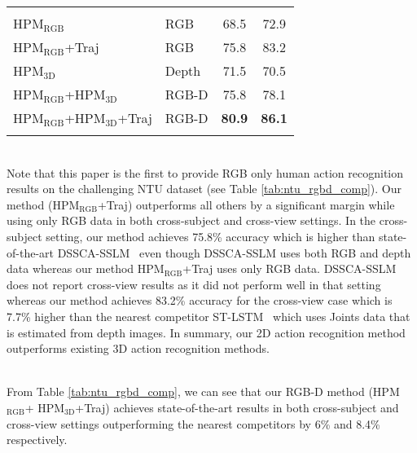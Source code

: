 \documentclass[twocolumn]{svjour3}          \smartqed  \usepackage{graphicx}
\begin{document}
\begin{table*}
{\begin{tabular}{llcc}
\noalign{\smallskip}\hline\noalign{\smallskip}
\multicolumn{ 3}{c}{\textbf{Proposed}} & \multicolumn{1}{l}{} \\ \noalign{\smallskip}\hline\noalign{\smallskip}

HPM$_{\mathrm{RGB}}$ & RGB & 68.5 & 72.9 \\ HPM$_{\mathrm{RGB}}$+Traj & RGB & 75.8 & 83.2 \\ HPM$_{\mathrm{3D}}$ & Depth & 71.5 & 70.5 \\ HPM$_{\mathrm{RGB}}$+HPM$_{\mathrm{3D}}$ & RGB-D & 75.8 & 78.1 \\ HPM$_{\mathrm{RGB}}$+HPM$_{\mathrm{3D}}$+Traj & RGB-D & \bf{80.9} & \bf{86.1} \\ 

\hline\noalign{\smallskip}
\end{tabular}
}
\end{table*}


\vspace{2mm}
\\
Note that this paper is the first to provide RGB only human action recognition results on the challenging NTU dataset (see Table \ref{tab:ntu_rgbd_comp}). Our method (HPM$_{\mathrm{RGB}}$+Traj) outperforms all others by a significant margin while using only RGB data in both cross-subject and cross-view settings. In the cross-subject setting, our method achieves 75.8\% accuracy which is higher than state-of-the-art DSSCA-SSLM~\citep{shahroudy2017deep} even though DSSCA-SSLM uses both RGB and depth data whereas our method HPM$_{\mathrm{RGB}}$+Traj uses only RGB data. DSSCA-SSLM does not report cross-view results as it did not perform well in that setting~\citep{shahroudy2017deep} whereas our method achieves 83.2\% accuracy for the cross-view case which is 7.7\% higher than the nearest competitor ST-LSTM~\citep{liu2016spatio} which uses Joints data that is estimated from depth images. In summary, our 2D action recognition method outperforms existing 3D action recognition methods.


\vspace{2mm}
\\
From Table \ref{tab:ntu_rgbd_comp}, we can see that our RGB-D method (HPM$_{\mathrm{RGB}}$+ HPM$_{\mathrm{3D}}$+Traj) achieves state-of-the-art results in both cross-subject and cross-view settings outperforming the nearest competitors by 6\% and 8.4\% respectively.
\end{document}
